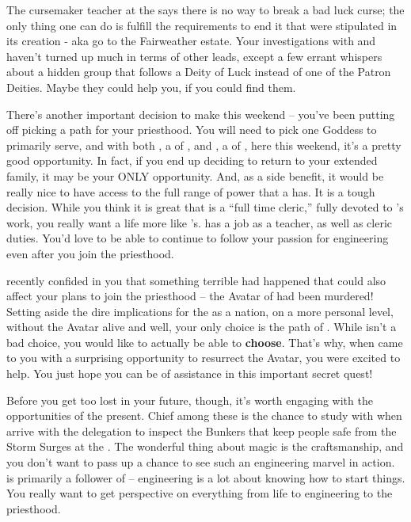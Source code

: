 \documentclass[char]{GL2020}
\begin{document}
The cursemaker teacher at the \pSchool{} says there is no way to break a bad luck curse; the only thing one can do is fulfill the requirements to end it that were stipulated in its creation - aka go to the Fairweather estate. Your investigations with \cPresident{} and \cWarlordDaughter{} haven't turned up much in terms of other leads, except a few errant whispers about a hidden group that follows a Deity of Luck instead of one of the Patron Deities. Maybe they could help you, if you could find them.

There's another important decision to make this weekend – you've been putting off picking a path for your priesthood. You will need to pick one Goddess to primarily serve, and with both \cEbbPriest{\full}, a \cEbbPriest{\cleric} of \cEbbFull{\full}, and \cFlowPriest{\full}, a \cEbbPriest{\cleric} of \cFlowFull{\full}, here this weekend, it's a pretty good opportunity. In fact, if you end up deciding to return to your extended family, it may be your ONLY opportunity. And, as a side benefit, it would be really nice to have access to the full range of power that a \cInitiate{\cleric} has. It is a tough decision. While you think it is great that \cEbbPriest{} is a ``full time cleric,'' fully devoted to \cEbb{}'s work, you really want a life more like \cFlowPriest{\full}'s. \cFlowPriest{} has a job as a teacher, as well as \cFlowPriest{\their} cleric duties. You'd love to be able to continue to follow your passion for engineering even after you join the priesthood.

\cFlowPriest{} recently confided in you that something terrible had happened that could also affect your plans to join the priesthood – the Avatar of \cEbb{} had been murdered! Setting aside the dire implications for the \pShip{} as a nation, on a more personal level, without the \cEbb{} Avatar alive and well, your only choice is the path of \cFlow{}. While \cFlow{} isn't a bad choice, you would like to actually be able to \textbf{choose}. That's why, when \cFlowPriest{} came to you with a surprising opportunity to resurrect the Avatar, you were excited to help. You just hope you can be of assistance in this important secret quest!

Before you get too lost in your future, though, it's worth engaging with the opportunities of the present. Chief among these is the chance to study with \cBunker{\full} when \cBunker{\they} arrive\cBunker{\plural} with the \pShip{} delegation to inspect the Bunkers that keep people safe from the Storm Surges at the \pSc{}. The wonderful thing about \pShippie{} magic is the craftsmanship, and you don't want to pass up a chance to see such an engineering marvel in action. \cBunker{} is primarily a follower of \cFlow{} -- engineering is a lot about knowing how to start things. You really want to get \cBunker{\their} perspective on everything from life to engineering to the priesthood.
\end{document}
